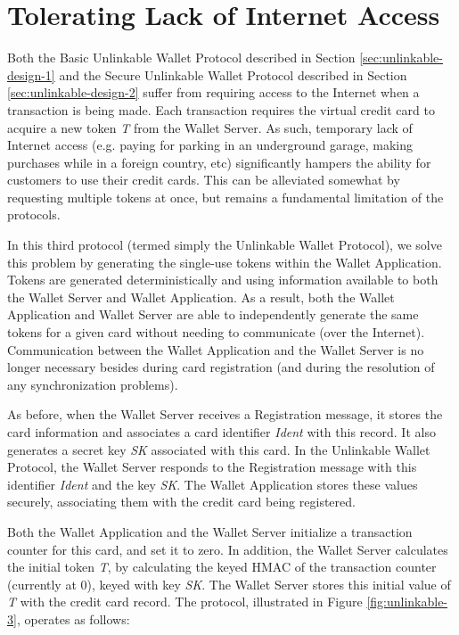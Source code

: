 \section{Tolerating Lack of Internet Access}
\label{sec:unlinkable-design-3}

Both the Basic Unlinkable Wallet Protocol described in Section \ref{sec:unlinkable-design-1}
    and the Secure Unlinkable Wallet Protocol described in Section \ref{sec:unlinkable-design-2}
    suffer from requiring access to the Internet when a transaction is being made.
Each transaction requires the virtual credit card to acquire a new token \emph{T} from the Wallet Server.
As such, temporary lack of Internet access
    (e.g. paying for parking in an underground garage, making purchases while in a foreign country, etc)
    significantly hampers the ability for customers to use their credit cards.
This can be alleviated somewhat by requesting multiple tokens at once, but remains a fundamental limitation of the protocols.

In this third protocol (termed simply the Unlinkable Wallet Protocol), we solve this problem by generating the single-use tokens within the Wallet Application.
Tokens are generated deterministically and using information available to both the Wallet Server and Wallet Application.
As a result, both the Wallet Application and Wallet Server are able to independently generate the same tokens for a given card without needing to communicate
    (over the Internet).
Communication between the Wallet Application and the Wallet Server is no longer necessary besides during card registration (and during the resolution of any synchronization problems).

As before, when the Wallet Server receives a Registration message, it stores the card information and associates a card identifier \emph{Ident} with this record.
It also generates a secret key \emph{SK} associated with this card.
In the Unlinkable Wallet Protocol, the Wallet Server responds to the Registration message with this identifier \emph{Ident} and the key \emph{SK}.
The Wallet Application stores these values securely, associating them with the credit card being registered.

Both the Wallet Application and the Wallet Server initialize a transaction counter for this card, and set it to zero.
In addition, the Wallet Server calculates the initial token \emph{T}, by calculating the keyed HMAC of the transaction counter (currently at 0), keyed with key \emph{SK}.
The Wallet Server stores this initial value of \emph{T} with the credit card record.
The protocol, illustrated in Figure \ref{fig:unlinkable-3}, operates as follows:

